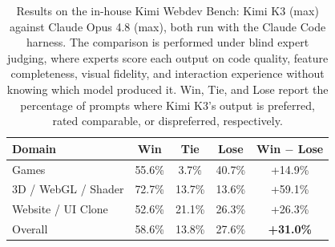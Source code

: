\begin{table}[t]
\centering
\footnotesize
\caption{Results on the in-house Kimi Webdev Bench: Kimi K3 (max) against Claude Opus 4.8 (max), both run with the Claude Code harness. The comparison is performed under blind expert judging, where experts score each output on code quality, feature completeness, visual fidelity, and interaction experience without knowing which model produced it. Win, Tie, and Lose report the percentage of prompts where Kimi K3's output is preferred, rated comparable, or dispreferred, respectively.}
\label{tab:k3_webdev_internal}
\begin{tabular}{@{}l c c c c@{}}
\toprule
\textbf{Domain} & \textbf{Win} & \textbf{Tie} & \textbf{Lose} & \textbf{Win $-$ Lose} \\
\midrule
Games & 55.6\% & 3.7\% & 40.7\% & +14.9\% \\
3D / WebGL / Shader & 72.7\% & 13.7\% & 13.6\% & +59.1\% \\
Website / UI Clone & 52.6\% & 21.1\% & 26.3\% & +26.3\% \\
\midrule
Overall & 58.6\% & 13.8\% & 27.6\% & \textbf{+31.0\%} \\
\bottomrule
\end{tabular}
\end{table}
